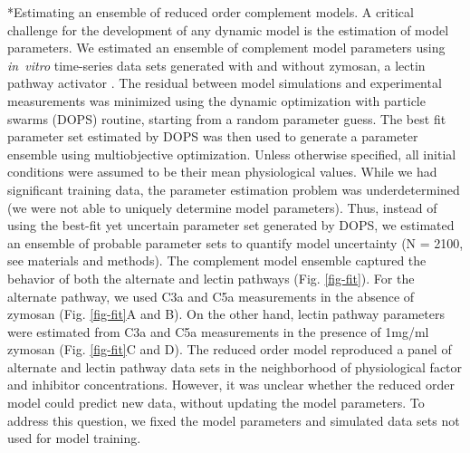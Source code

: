 \documentclass[12pt]{article}
\makeatletter
\renewcommand\subsection{\@startsection
	{subsection}{2}{0mm}
	{-0.05in}
	{-0.5\baselineskip}
	{\normalfont\normalsize\bfseries}}
\makeatother
\begin{document}
\subsection*{Estimating an ensemble of reduced order complement models.}
A critical challenge for the development of any dynamic model is the estimation of model parameters.
We estimated an ensemble of complement model parameters using \textit{in~vitro} time-series data sets generated with and without zymosan, a lectin pathway activator \cite{morad2015time}.
The residual between model simulations and experimental measurements was minimized using the dynamic optimization with particle swarms (DOPS) routine,
starting from a random parameter guess. The best fit parameter set estimated by DOPS was then used to generate a parameter ensemble using multiobjective optimization.
Unless otherwise specified, all initial conditions were assumed to be their mean physiological values.
While we had significant training data, the parameter estimation problem was underdetermined (we were not able to uniquely determine model parameters).
Thus, instead of using the best-fit yet uncertain parameter set generated by DOPS, we estimated an ensemble of probable parameter sets to quantify model uncertainty
(N = 2100, see materials and methods).
The complement model ensemble captured the behavior of both the alternate and lectin pathways (Fig. \ref{fig-fit}).
For the alternate pathway, we used C3a and C5a measurements in the absence of zymosan (Fig. \ref{fig-fit}A and B).
On the other hand, lectin pathway parameters were estimated from C3a and C5a measurements in the presence of 1mg/ml zymosan (Fig. \ref{fig-fit}C and D).
The reduced order model reproduced a panel of alternate and lectin pathway data sets in the neighborhood of physiological factor and inhibitor concentrations.
However, it was unclear whether the reduced order model could predict new data, without updating the model parameters.
To address this question, we fixed the model parameters and simulated data sets not used for model training.

\end{document}
